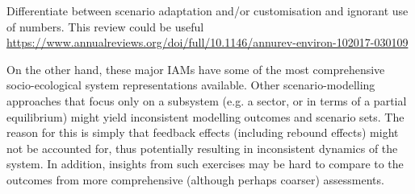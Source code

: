 \documentclass{article}
\begin{document}
\begin{refsection}

Differentiate between scenario adaptation and/or customisation and ignorant use of numbers. This review could be useful \url{https://www.annualreviews.org/doi/full/10.1146/annurev-environ-102017-030109}

On the other hand, these major IAMs have some of the most comprehensive socio-ecological system representations available. Other scenario-modelling approaches that focus only on a subsystem (e.g. a sector, or in terms of a partial equilibrium) might yield inconsistent modelling outcomes and scenario sets. The reason for this is simply that feedback effects (including rebound effects) might not be accounted for, thus potentially resulting in inconsistent dynamics of the system. In addition, insights from such exercises may be hard to compare to the outcomes from more comprehensive (although perhaps coarser) assessments.


\end{refsection}
\end{document}
